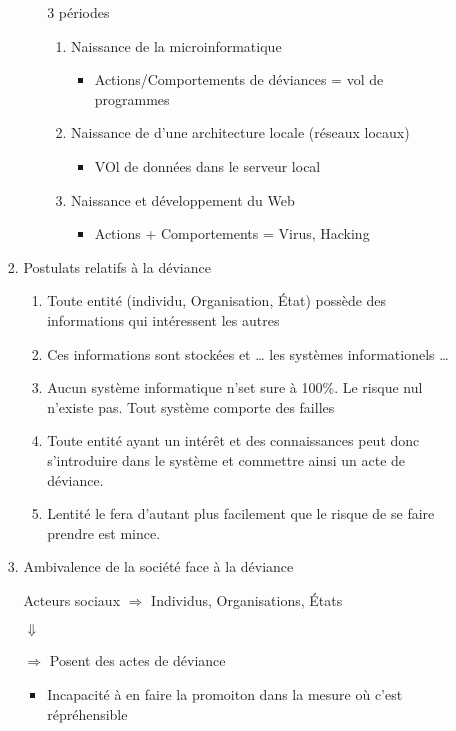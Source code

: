 \documentclass[11pt]{article}
\begin{document}
\begin{enumerate}
\begin{enumerate}
\begin{enumerate}
\begin{enumerate}
3 périodes
\begin{enumerate}
\item Naissance de la microinformatique
\begin{itemize}
\item Actions/Comportements de déviances = vol de programmes
\end{itemize}
\item Naissance de d'une architecture locale (réseaux locaux)
\begin{itemize}
\item VOl de données dans le serveur local
\end{itemize}
\item Naissance et développement du Web
\begin{itemize}
\item Actions + Comportements = Virus, Hacking
\end{itemize}
\end{enumerate}
\end{enumerate}

\item Postulats relatifs à la déviance
\label{sec:orgae44af2}

\begin{enumerate}
\item Toute entité (individu, Organisation, État) possède des informations qui
intéressent les autres
\item Ces informations sont stockées et \ldots{} les systèmes informationels \ldots{}
\item Aucun système informatique n'set sure à 100\%.  Le risque nul n'existe pas.
Tout système comporte des failles
\item Toute entité ayant un intérêt et des connaissances peut donc s'introduire
dans le système et commettre ainsi un acte de déviance.
\item Lentité le fera d'autant plus facilement que le risque de se faire prendre
est mince.
\end{enumerate}

\item Ambivalence de la société face à la déviance
\label{sec:orgb279456}

Acteurs sociaux \(\Rightarrow\) Individus, Organisations, États

\(\Downarrow\)

\(\Rightarrow\) Posent des actes de déviance
\begin{itemize}
\item Incapacité à en faire la promoiton dans la mesure où c'est répréhensible
\end{itemize}


\end{enumerate}
\end{enumerate}
\end{enumerate}
\end{document}
